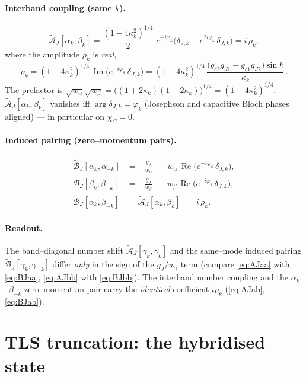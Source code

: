 \documentclass[11pt]{article}
\newcommand{\dJ}{\delta_{J,k}}
\newcommand{\dJb}{\bar\delta_{J,k}}
\newcommand{\kk}{\kappa_k}
\newcommand{\ph}{\varphi_k}
\newcommand{\gJ}{g_J}
\newcommand{\wa}{w_{\alpha}}
\newcommand{\wb}{w_{\beta}}
\newcommand{\AJ}{\tilde{\mathcal{A}}_J}
\newcommand{\BJ}{\tilde{\mathcal{B}}_J}
\renewcommand{\Re}{\operatorname{Re}}
\renewcommand{\Im}{\operatorname{Im}}
\begin{document}
\paragraph{Interband coupling (same $k$).}
\begin{equation}\label{eq:AJab}
  \boxed{\;
  \AJ[\alpha_k,\beta_k]
    =\frac{(1-4\kk^{2})^{1/4}}{2}\;e^{-i\ph}\bigl(\dJ-e^{2i\ph}\,\dJb\bigr)
    = i\,\rho_k,
  \;}
\end{equation}
where the amplitude $\rho_k$ is \emph{real},
\begin{equation}\label{eq:rho}
  \boxed{\;
  \rho_k=(1-4\kk^{2})^{1/4}\,\Im\!\bigl(e^{-i\ph}\,\dJ\bigr)
        =(1-4\kk^{2})^{1/4}\,
         \frac{\bigl(g_{c2}g_{J1}-g_{c1}g_{J2}\bigr)\sin k}{\kk}\,.
  \;}
\end{equation}
The prefactor is $\sqrt{\wa}\sqrt{\wb}=\bigl((1+2\kk)(1-2\kk)\bigr)^{1/4}=(1-4\kk^{2})^{1/4}$.
$\AJ[\alpha_k,\beta_k]$ vanishes iff $\arg\dJ=\ph$ (Josephson and capacitive
Bloch phases aligned) --- in particular on $\chi_C=0$.

\paragraph{Induced pairing (zero--momentum pairs).}
\begin{align}
  \BJ[\alpha_k,\alpha_{-k}]
    &= -\frac{\gJ}{\wa}\;-\;\wa\,\Re\!\bigl(e^{-i\ph}\,\dJ\bigr),
     \label{eq:BJaa}\\[4pt]
  \BJ[\beta_k,\beta_{-k}]
    &= -\frac{\gJ}{\wb}\;+\;\wb\,\Re\!\bigl(e^{-i\ph}\,\dJ\bigr),
     \label{eq:BJbb}\\[4pt]
  \BJ[\alpha_k,\beta_{-k}]
    &= \AJ[\alpha_k,\beta_k]\;=\;i\,\rho_k .
     \label{eq:BJab}
\end{align}

\paragraph{Readout.}
The band--diagonal number shift $\AJ[\gamma_k,\gamma_k]$ and the same--mode induced
pairing $\BJ[\gamma_k,\gamma_{-k}]$ differ \emph{only} in the sign of the
$\gJ/w_\gamma$ term (compare \eqref{eq:AJaa} with \eqref{eq:BJaa},
\eqref{eq:AJbb} with \eqref{eq:BJbb}). The interband number coupling and the
$\alpha_k$--$\beta_{-k}$ zero--momentum pair carry the \emph{identical} coefficient
$i\rho_k$ (\eqref{eq:AJab}, \eqref{eq:BJab}).

\section{TLS truncation: the hybridised state}\label{sec:tls}
\end{document}
